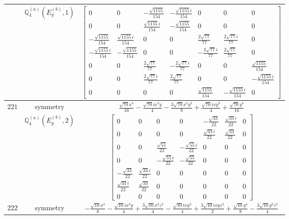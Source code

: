 \documentclass[fleqn,8pt,landscape]{jsarticle}
\begin{document}
\begin{longtable}{ccc}
$  $ & $ \mathbb{Q}_{4}^{(a)}(E_{g}^{(b)},1) $ & $ \begin{bmatrix} 0 & 0 & - \frac{\sqrt{1155}}{154} & - \frac{\sqrt{1155} i}{154} & 0 & 0 & 0 \\ 0 & 0 & \frac{\sqrt{1155} i}{154} & - \frac{\sqrt{1155}}{154} & 0 & 0 & 0 \\ - \frac{\sqrt{1155}}{154} & \frac{\sqrt{1155} i}{154} & 0 & 0 & \frac{2 \sqrt{77}}{77} & \frac{2 \sqrt{77} i}{77} & 0 \\ - \frac{\sqrt{1155} i}{154} & - \frac{\sqrt{1155}}{154} & 0 & 0 & - \frac{2 \sqrt{77} i}{77} & \frac{2 \sqrt{77}}{77} & 0 \\ 0 & 0 & \frac{2 \sqrt{77}}{77} & - \frac{2 \sqrt{77} i}{77} & 0 & 0 & \frac{\sqrt{1155}}{154} \\ 0 & 0 & \frac{2 \sqrt{77} i}{77} & \frac{2 \sqrt{77}}{77} & 0 & 0 & - \frac{\sqrt{1155} i}{154} \\ 0 & 0 & 0 & 0 & \frac{\sqrt{1155}}{154} & - \frac{\sqrt{1155} i}{154} & 0 \end{bmatrix} $ \\ \hline
$ 221 $ & $ \text{symmetry} $ & $ \frac{\sqrt{70} x^{4}}{16} - \frac{\sqrt{70} i x^{3} y}{4} - \frac{3 \sqrt{70} x^{2} y^{2}}{8} + \frac{\sqrt{70} i x y^{3}}{4} + \frac{\sqrt{70} y^{4}}{16} $ \\
$  $ & $ \mathbb{Q}_{4}^{(a)}(E_{g}^{(b)},2) $ & $ \begin{bmatrix} 0 & 0 & 0 & 0 & - \frac{\sqrt{33}}{22} & \frac{\sqrt{33} i}{22} & 0 \\ 0 & 0 & 0 & 0 & \frac{\sqrt{33} i}{22} & \frac{\sqrt{33}}{22} & 0 \\ 0 & 0 & \frac{\sqrt{55}}{22} & - \frac{\sqrt{55} i}{22} & 0 & 0 & 0 \\ 0 & 0 & - \frac{\sqrt{55} i}{22} & - \frac{\sqrt{55}}{22} & 0 & 0 & 0 \\ - \frac{\sqrt{33}}{22} & \frac{\sqrt{33} i}{22} & 0 & 0 & 0 & 0 & 0 \\ \frac{\sqrt{33} i}{22} & \frac{\sqrt{33}}{22} & 0 & 0 & 0 & 0 & 0 \\ 0 & 0 & 0 & 0 & 0 & 0 & 0 \end{bmatrix} $ \\ \hline
$ 222 $ & $ \text{symmetry} $ & $ - \frac{\sqrt{10} x^{4}}{8} - \frac{\sqrt{10} i x^{3} y}{4} + \frac{3 \sqrt{10} x^{2} z^{2}}{4} - \frac{\sqrt{10} i x y^{3}}{4} + \frac{3 \sqrt{10} i x y z^{2}}{2} + \frac{\sqrt{10} y^{4}}{8} - \frac{3 \sqrt{10} y^{2} z^{2}}{4} $ \\

\end{longtable}
\end{document}
